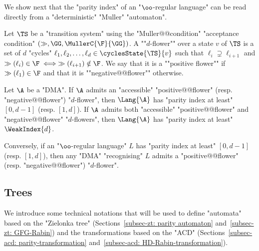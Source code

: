\documentclass{theoretics}
\begin{document}
We show next that the "parity index" of an "$\oo$-regular language" can be read directly from a "deterministic" "Muller" "automaton". 
	
Let $\TS$ be a "transition system" using the "Muller@@condition" "acceptance condition" $(\gg, \GG, \MullerC{\F}{\GG})$. 
\AP A ""$d$-flower"" over a state $v$ of $\TS$ is a set of $d$ "cycles" $\ell_1, \ell_2, \dots, \ell_{d}\in \cyclesState{\TS}{v}$ such that $\ell_i \supsetneq \ell_{i+1}$ and $\gg(\ell_i)\in \F \iff \gg(\ell_{i+1})\notin \F$. We say that it is a ""positive flower""  if $\gg(\ell_{1})\in \F$ and that it is ""negative@@flower"" otherwise.

\begin{lemma}\label{lemma:flower-lemma}
	Let $\A$ be a "DMA". If $\A$ admits an "accessible" "positive@@flower" (resp. "negative@@flower") "$d$-flower", then $\Lang{\A}$ has "parity index at least" $[0,d-1]$ (resp. $[1,d]$). If $\A$ admits both "accessible" "positive@@flower" and "negative@@flower" "$d$-flowers", then $\Lang{\A}$ has "parity index at least" $\WeakIndex{d}$.
	
	Conversely, if an "$\oo$-regular language" $L$ has "parity index at least" $[0,d-1]$ (resp. $[1,d]$), then any "DMA" "recognising" $L$ admits a "positive@@flower" (resp. "negative@@flower") "$d$-flower".
\end{lemma}


\subsection{Trees}\label{subsect-prelim:trees}
We introduce some technical notations that will be used to define "automata" based on the "Zielonka tree" (Sections~\ref{subsec-zt: parity automaton} and~\ref{subsec-zt: GFG-Rabin}) and the transformations based on the "ACD" (Sections~\ref{subsec-acd: parity-transformation} and~\ref{subsec-acd: HD-Rabin-transformation}).
\end{document}
